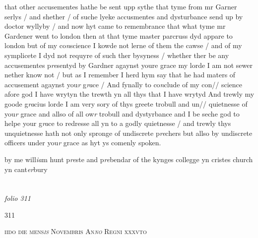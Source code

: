 \documentclass[12pt, a4paper]{book}
\begin{document}
		\ifthenelse{\isodd{\thepage}}
		{\reversemarginpar}
		{\normalmarginpar}
		that other accusementes hathe be sent upp sythe that tyme from mr Garner
serlys / and shether / of suche lyeke accusmentes and dysturbance send up by
doctor wyllyby / and now hyt came to remembrance that what tyme
mr Gardener went to london then at that tyme master parcruss dyd appare
to london but of my co\textit{n}science I kowde not lerne of them the cawse / and
of my symplicete I dyd not requyre of such ther bysyness / whether ther be
any accusementes p\textit{re}sentyd by Gardner agaynst youre grace my lorde I am not 
sewer nether know not / but as I remember I herd hym say that he had
maters of accusement agaynst you\textit{r} g\textit{ra}ce / And fynally to co\textit{n}clude of my con//
science afore god I have wrytyn the trewth yn all thys that I have wrytyd
And trewly my goode g\textit{ra}cius lorde I am very sory of thys greete trobull and un//
quietnesse of you\textit{r} grace and allso of all ow\textit{r} trobull and dystyrbance and
I be seche god to helpe your g\textit{ra}ce to redresse all yn to a godly quietnesse /
and trewly thys unquietnesse hath not only spronge of undiscrete p\textit{re}chers
but allso by undiscrete officers under you\textit{r} grace as hyt ys comenly spoken.


		\ifthenelse{\isodd{\thepage}}
		{\reversemarginpar}
		{\normalmarginpar}
		by me will\textit{ia}m hunt
p\textit{re}ste and p\textit{re}bendar of
the kynges collegge yn 
cristes church yn cant\textit{er}bury

\dotfill
						\newpage {} \section*{}  \subsection*{}

\textit{folio 311}



\begin{flushright}{\color{Mahogany}311}\end{flushright}
            		
				\begin{center} \begin{large} {\scshape iido die mens\textit{is} Novembris An\textit{no} Regni xxxvto} \end{large} \end{center}
			
\end{document}
